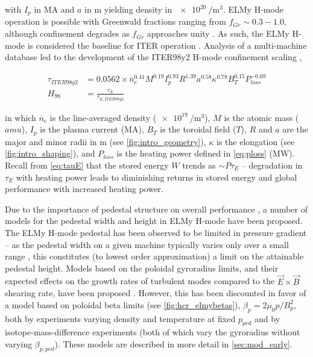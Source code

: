 \noindent with $I_p$ in $\si{\mega\ampere}$ and $a$ in $\si{\meter}$ yielding density in $\SI{e20}{\per\meter\cubed}$.  ELMy H-mode operation is possible with Greenwald fractions ranging from $f_{Gr} \sim 0.3-1.0$, although confinement degrades as $f_{Gr}$ approaches unity \cite{Saibene1999,Joffrin2014}.  As such, the ELMy H-mode is considered the baseline for ITER operation \cite{ITER1999,Shimada2007}.  Analysis of a multi-machine database \cite{Christiansen1992} led to the development of the ITER98y2 H-mode confinement scaling \cite{ITER1999},

\begin{align}
 \tau_{ITER98y2} &= 0.0562 \times \overline{n}_e^{0.41} M^{0.19} I_p^{0.93} R^{1.39} a^{0.58} \kappa^{0.78} B_T^{0.15} P_{loss}^{-0.69}\label{eq:tau98}\\
 H_{98} &= \frac{\tau_E}{\tau_{E,ITER98y2}}\label{eq:H98}
\end{align}

\noindent in which $\overline{n}_e$ is the line-averaged density ($\SI{e19}{\per\meter\cubed}$), $M$ is the atomic mass ($\si{amu}$), $I_p$ is the plasma current ($\si{\mega\ampere}$), $B_T$ is the toroidal field ($\si{T}$), $R$ and $a$ are the major and minor radii in $\si{\meter}$ (see \cref{fig:intro_geometry}), $\kappa$ is the elongation (see \cref{fig:intro_shaping}), and $P_{loss}$ is the heating power defined in \cref{eq:ploss} ($\si{\mega\watt}$).  Recall from \cref{eq:tauE} that the stored energy $W$ trends as $\sim P \tau_E$ -- degradation in $\tau_E$ with heating power leads to diminishing returns in stored energy and global performance with increased heating power.

Due to the importance of pedestal structure on overall performance \cite{Kinsey2011}, a number of models for the pedestal width and height in ELMy H-mode have been proposed.  The ELMy H-mode pedestal has been observed to be limited in pressure gradient \cite{Connor1998,Urano2003} -- as the pedestal width on a given machine typically varies only over a small range \cite{Maggi2010,Schneider2013}, this constitutes (to lowest order approximation) a limit on the attainable pedestal height.  Models based on the poloidal gyroradius limits, and their expected effects on the growth rates of turbulent modes compared to the $\vec{E}\times\vec{B}$ shearing rate, have been proposed \cite{Groebner1998a,Beurskens2011}.  However, this has been discounted in favor of a model based on poloidal beta limits (see \cref{fig:hcr_elmybetas}), $\beta_p = 2\mu_0 p/B_p^2$, both by experiments varying density and temperature at fixed $p_{ped}$ \cite{Osborne1998} and by isotope-mass-difference experiments \cite{Urano2008} (both of which vary the gyroradius without varying $\beta_{p,ped}$).  These models are described in more detail in \cref{sec:mod_early}.


